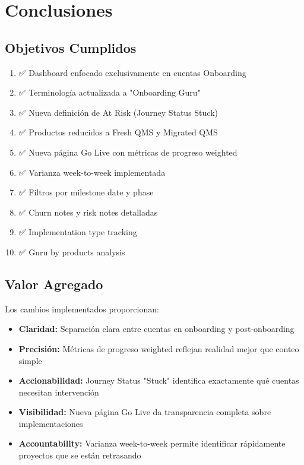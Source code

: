 \documentclass[12pt,a4paper]{article}
\begin{document}
\section{Conclusiones}

\subsection{Objetivos Cumplidos}

\begin{enumerate}
    \item ✅ Dashboard enfocado exclusivamente en cuentas Onboarding
    \item ✅ Terminología actualizada a "Onboarding Guru"
    \item ✅ Nueva definición de At Risk (Journey Status Stuck)
    \item ✅ Productos reducidos a Fresh QMS y Migrated QMS
    \item ✅ Nueva página Go Live con métricas de progreso weighted
    \item ✅ Varianza week-to-week implementada
    \item ✅ Filtros por milestone date y phase
    \item ✅ Churn notes y risk notes detalladas
    \item ✅ Implementation type tracking
    \item ✅ Guru by products analysis
\end{enumerate}

\subsection{Valor Agregado}

Los cambios implementados proporcionan:

\begin{itemize}
    \item \textbf{Claridad:} Separación clara entre cuentas en onboarding y post-onboarding
    \item \textbf{Precisión:} Métricas de progreso weighted reflejan realidad mejor que conteo simple
    \item \textbf{Accionabilidad:} Journey Status "Stuck" identifica exactamente qué cuentas necesitan intervención
    \item \textbf{Visibilidad:} Nueva página Go Live da transparencia completa sobre implementaciones
    \item \textbf{Accountability:} Varianza week-to-week permite identificar rápidamente proyectos que se están retrasando
\end{itemize}
\end{document}
